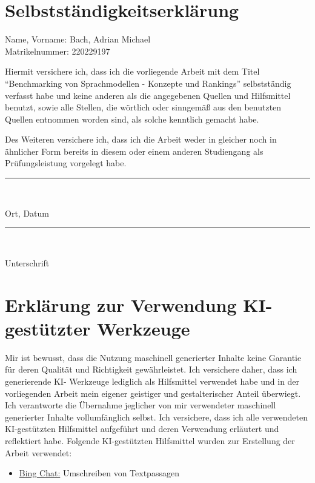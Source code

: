 \section*{Selbstständigkeitserklärung}

Name, Vorname: Bach, Adrian Michael\\
Matrikelnummer: 220229197

\medskip
\noindent Hiermit versichere ich, dass ich die vorliegende Arbeit mit dem Titel \enquote{Benchmarking von Sprachmodellen - Konzepte und Rankings} selbstständig verfasst habe und keine anderen als die angegebenen Quellen und Hilfsmittel benutzt, sowie alle Stellen, die wörtlich oder sinngemäß aus den benutzten Quellen entnommen worden sind, als solche kenntlich gemacht habe.

\medskip
\noindent
Des Weiteren versichere ich, dass ich die Arbeit weder in gleicher noch in ähnlicher Form bereits in diesem oder einem anderen Studiengang als Prüfungsleistung vorgelegt habe.


\vspace{3cm}
\parbox{4cm}{
    \rule{5cm}{1pt}\\
    \centerline{Ort, Datum}
}\hfill
\parbox{5cm}{
    \rule{5cm}{1pt}\\
    \centerline{Unterschrift}
}

\newpage
\section*{Erklärung zur Verwendung KI-gestützter Werkzeuge}
Mir ist bewusst, dass die Nutzung maschinell generierter Inhalte keine Garantie für deren
Qualität und Richtigkeit gewährleistet. Ich versichere daher, dass ich generierende KI-
Werkzeuge lediglich als Hilfsmittel verwendet habe und in der vorliegenden Arbeit mein
eigener geistiger und gestalterischer Anteil überwiegt.
Ich verantworte die Übernahme jeglicher von mir verwendeter maschinell generierter Inhalte
vollumfänglich selbst. Ich versichere, dass ich alle verwendeten KI-gestützten Hilfsmittel
aufgeführt und deren Verwendung erläutert und reflektiert habe.
Folgende KI-gestützten Hilfsmittel wurden zur Erstellung der Arbeit verwendet:
\begin{itemize}
    \item \href{http://www.bing.com/chat}{Bing Chat:} Umschreiben von Textpassagen
\end{itemize}
